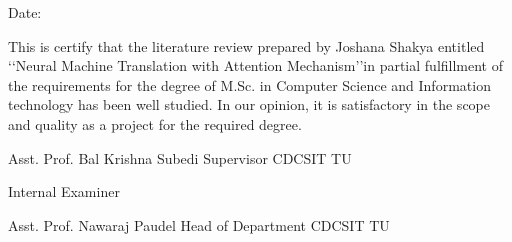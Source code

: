 \vspace{1cm}

\begin{flushright}
Date: \dottedline{4cm}
\end{flushright}

\vspace{1cm}

This is certify that the literature review prepared by Joshana Shakya entitled \lq\lq Neural Machine Translation with Attention Mechanism\rq\rq in partial fulfillment of the requirements for the degree of M.Sc. in Computer Science and Information technology has been well studied. In our opinion, it is satisfactory in the scope and quality as a project for the required degree. 

\vspace{2cm}

\begin{flushleft}
\dottedline{5.8cm} \newline
Asst. Prof. Bal Krishna Subedi \newline
Supervisor \newline
CDCSIT \newline
TU \newline
\end{flushleft}

\vspace{2cm}

\begin{flushleft}
\dottedline{5.8cm} \newline
Internal Examiner
\end{flushleft}

\vspace{2cm}

\begin{flushleft}
\dottedline{5.8cm} \newline       
Asst. Prof. Nawaraj Paudel \newline
Head of Department
CDCSIT \newline
TU \newline
\end{flushleft}

\clearpage
